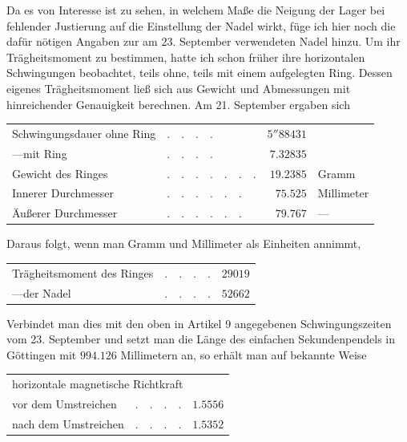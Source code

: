 Da es von Interesse ist zu sehen, in welchem Maße die Neigung der Lager bei fehlender Justierung auf die Einstellung der Nadel wirkt, füge ich hier noch die dafür nötigen Angaben zur am 23. September verwendeten Nadel hinzu. Um ihr Trägheitsmoment zu bestimmen, hatte ich schon früher ihre horizontalen Schwingungen beobachtet, teils ohne, teils mit einem aufgelegten Ring. Dessen eigenes Trägheitsmoment ließ sich aus Gewicht und Abmessungen mit hinreichender Genauigkeit berechnen. Am 21. September ergaben sich
\begin{center}
{\fontsize{9}{11}\selectfont
\begin{tabular}{llrl}
Schwingungsdauer ohne Ring&$.\quad.\quad.\quad.$&$5''88431$&\\
\hspace{2em}---\quad mit Ring&$.\quad.\quad.\quad.$&$7.32835$&\\
Gewicht des Ringes&$.\quad.\quad.\quad.\quad.\quad.\quad.$&$19.2385$&Gramm\\
Innerer Durchmesser&$.\quad.\quad.\quad.\quad.\quad.$&$75.525$&Millimeter\\
Äußerer Durchmesser&$.\quad.\quad.\quad.\quad.\quad.$&$79.767$&---
\end{tabular}}
\end{center}

Daraus folgt, wenn man Gramm und Millimeter als Einheiten annimmt,
\begin{center}
\begin{tabular}{llr}
Trägheitsmoment des Ringes&$.\quad.\quad.\quad.$&$29019$\\
\hspace{2em}---\quad der Nadel\footnotemark&$.\quad.\quad.\quad.$&$52662$
\end{tabular}
\end{center}


Verbindet man dies mit den oben in Artikel 9 angegebenen Schwingungszeiten vom 23. September und setzt man die Länge des einfachen Sekundenpendels in Göttingen mit $994.126$ Millimetern an, so erhält man auf bekannte Weise
\begin{center}
\begin{tabular}{llr}
\multicolumn{3}{l}{horizontale magnetische Richtkraft}\\
\quad vor dem Umstreichen&$.\quad.\quad.\quad.$&$1.5556$\\
\quad nach dem Umstreichen&$.\quad.\quad.\quad.$&$1.5352$
\end{tabular}
\end{center}

